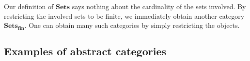 \documentclass[10pt,twoside,a4paper]{article}
\theoremstyle{plain}
\theoremstyle{definition}
\newcommand{\Sets}[0]{%
  \ensuremath{\mathbf{Sets}}%
}
\begin{document}
Our definition of \Sets{} says nothing about the cardinality of the
sets involved. By restricting the involved sets to be finite, we
immediately obtain another category $\Sets_{\mathbf{fin}}$. One can
obtain many such categories by simply restricting the objects.

\subsection{Examples of abstract categories}

%
%


\end{document}
